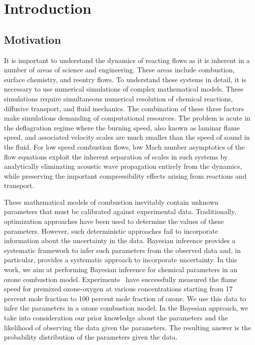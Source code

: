 
\chapter{Introduction}

\section{Motivation}
It is important to understand the dynamics of reacting flows as it is
inherent in a number of areas of science and engineering. These areas include
combustion, surface chemistry, and reentry flows. To understand these
systems in detail, it is necessary to use numerical simulations of
complex mathematical models. These
simulations require simultaneous numerical resolution of chemical
reactions, diffusive transport, and fluid mechanics. The combination
of these three factors make simulations demanding of computational
resources. The problem is acute in the deflagration regime where the
burning speed, also known as laminar flame speed, and associated
velocity scales are much smaller than the speed of sound in the fluid.
%
For low speed combustion flows, low Mach number asymptotics
of the flow equations exploit the inherent separation of scales in
such systems by analytically eliminating acoustic wave propagation
entirely from the dynamics, while preserving the important
compressibility effects arising from reactions and transport.

\bigskip


These mathematical models of combustion inevitably contain unknown
parameters that must be calibrated against experimental
data. Traditionally, optimization approaches have been used to
determine the values of these parameters. However,
such deterministic approaches fail to incorporate information about
the uncertainty in the data. Bayesian inference provides a systematic
framework to infer such parameters from the observed data and, in
particular, provides a systematic approach to incorporate uncertainty.
In this work, we aim at performing Bayesian inference for chemical
parameters in an ozone combustion model. Experiments~\cite{Streng} have
successfully measured the flame speed for premixed ozone-oxygen at
various concentrations starting from 17 percent mole fraction to 100 percent
mole fraction of ozone. We use this data to infer the
parameters in a ozone combustion model. In the Bayesian approach, we take
into consideration our prior knowledge about the parameters and the
likelihood of observing the data given the parameters. The resulting
answer is the probability distribution of the parameters given the
data.


